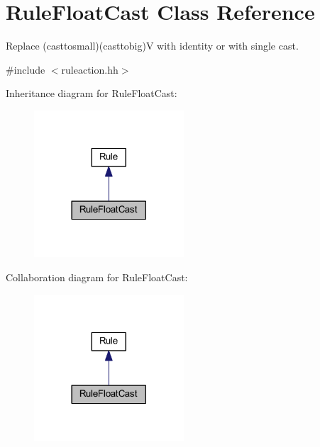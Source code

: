 \hypertarget{class_rule_float_cast}{}\section{Rule\+Float\+Cast Class Reference}
\label{class_rule_float_cast}


Replace (casttosmall)(casttobig)V with identity or with single cast.  




{\ttfamily \#include $<$ruleaction.\+hh$>$}



Inheritance diagram for Rule\+Float\+Cast\+:
\nopagebreak
\begin{figure}[H]
\begin{center}
\leavevmode
\includegraphics[width=158pt]{class_rule_float_cast__inherit__graph}
\end{center}
\end{figure}


Collaboration diagram for Rule\+Float\+Cast\+:
\nopagebreak
\begin{figure}[H]
\begin{center}
\leavevmode
\includegraphics[width=158pt]{class_rule_float_cast__coll__graph}
\end{center}
\end{figure}
